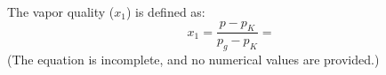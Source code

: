 The vapor quality (\( x_1 \)) is defined as:  
\[
x_1 = \frac{p - p_K}{p_g - p_K} = 
\]  
(The equation is incomplete, and no numerical values are provided.)